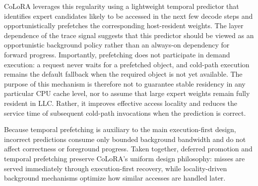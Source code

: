 \documentclass[sigplan,anonymous,review,nonacm]{acmart}
\begin{document}
CoLoRA leverages this regularity using a lightweight temporal predictor that identifies expert candidates likely to be accessed in the next few decode steps and opportunistically prefetches the corresponding host-resident weights. The layer dependence of the trace signal suggests that this predictor should be viewed as an opportunistic background policy rather than an always-on dependency for forward progress. Importantly, prefetching does not participate in demand execution: a request never waits for a prefetched object, and cold-path execution remains the default fallback when the required object is not yet available. The purpose of this mechanism is therefore not to guarantee stable residency in any particular CPU cache level, nor to assume that large expert weights remain fully resident in LLC. Rather, it improves effective access locality and reduces the service time of subsequent cold-path invocations when the prediction is correct.

Because temporal prefetching is auxiliary to the main execution-first design, incorrect predictions consume only bounded background bandwidth and do not affect correctness or foreground progress. Taken together, deferred promotion and temporal prefetching preserve CoLoRA's uniform design philosophy: misses are served immediately through execution-first recovery, while locality-driven background mechanisms optimize how similar accesses are handled later.




\end{document}
